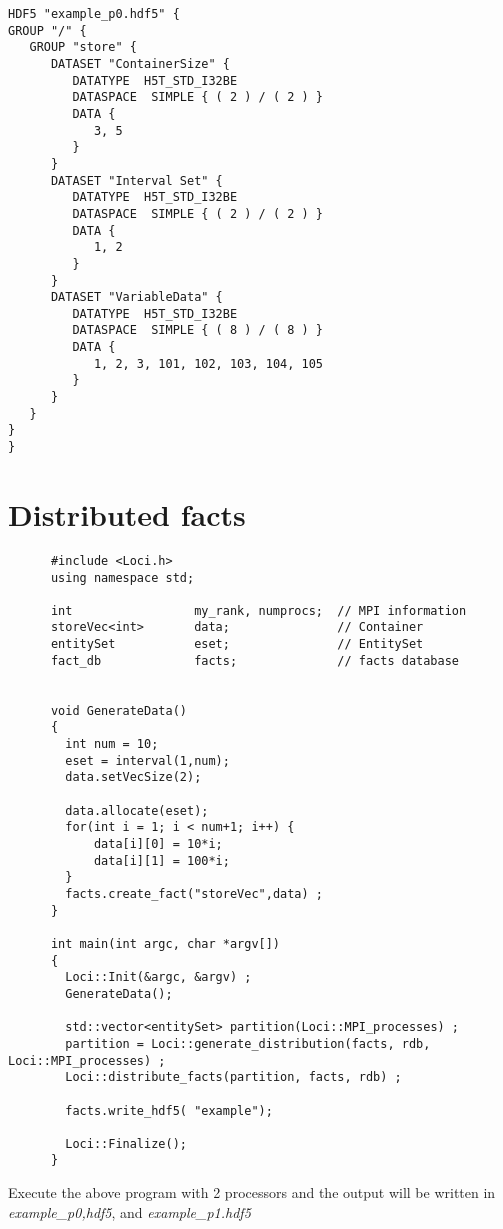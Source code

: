 \begin{verbatim}
HDF5 "example_p0.hdf5" {
GROUP "/" {
   GROUP "store" {
      DATASET "ContainerSize" {
         DATATYPE  H5T_STD_I32BE  
         DATASPACE  SIMPLE { ( 2 ) / ( 2 ) } 
         DATA {
            3, 5
         } 
      } 
      DATASET "Interval Set" {
         DATATYPE  H5T_STD_I32BE  
         DATASPACE  SIMPLE { ( 2 ) / ( 2 ) } 
         DATA {
            1, 2
         } 
      } 
      DATASET "VariableData" {
         DATATYPE  H5T_STD_I32BE  
         DATASPACE  SIMPLE { ( 8 ) / ( 8 ) } 
         DATA {
            1, 2, 3, 101, 102, 103, 104, 105
         } 
      } 
   } 
} 
} 
\end{verbatim}
\section {Distributed facts }
\begin{verbatim} 
      #include <Loci.h>
      using namespace std;
    
      int                 my_rank, numprocs;  // MPI information
      storeVec<int>       data;               // Container
      entitySet           eset;               // EntitySet
      fact_db             facts;              // facts database
    
    
      void GenerateData()
      {
        int num = 10;
        eset = interval(1,num);
        data.setVecSize(2);
    
        data.allocate(eset);
        for(int i = 1; i < num+1; i++) {
            data[i][0] = 10*i;
            data[i][1] = 100*i;
        }
        facts.create_fact("storeVec",data) ;
      }
    
      int main(int argc, char *argv[])
      {
        Loci::Init(&argc, &argv) ;
        GenerateData();
    
        std::vector<entitySet> partition(Loci::MPI_processes) ;
        partition = Loci::generate_distribution(facts, rdb, Loci::MPI_processes) ;
        Loci::distribute_facts(partition, facts, rdb) ;

        facts.write_hdf5( "example");
    
        Loci::Finalize();
      }
\end{verbatim} 
Execute the above program with 2 processors and the output will be written in {\em example\_p0,hdf5},
and {\em example\_p1.hdf5}
